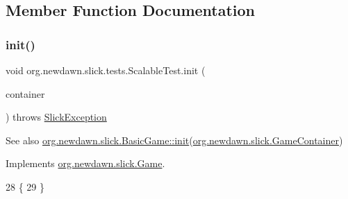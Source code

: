 \subsection{Member Function Documentation}
\mbox{\label{classorg_1_1newdawn_1_1slick_1_1tests_1_1_scalable_test_a99f4c97d1a23306b8313fbb32fd09451}} 
\subsubsection{\texorpdfstring{init()}{init()}}
{\footnotesize\ttfamily void org.\+newdawn.\+slick.\+tests.\+Scalable\+Test.\+init (\begin{DoxyParamCaption}\item[{\mbox{\hyperlink{classorg_1_1newdawn_1_1slick_1_1_game_container}{Game\+Container}}}]{container }\end{DoxyParamCaption}) throws \mbox{\hyperlink{classorg_1_1newdawn_1_1slick_1_1_slick_exception}{Slick\+Exception}}\hspace{0.3cm}{\ttfamily [inline]}}

\begin{DoxySeeAlso}{See also}
\mbox{\hyperlink{classorg_1_1newdawn_1_1slick_1_1_basic_game_a8af0900217e4d389249f71367b22d114}{org.\+newdawn.\+slick.\+Basic\+Game\+::init}}(\mbox{\hyperlink{classorg_1_1newdawn_1_1slick_1_1_game_container}{org.\+newdawn.\+slick.\+Game\+Container}}) 
\end{DoxySeeAlso}


Implements \mbox{\hyperlink{interfaceorg_1_1newdawn_1_1slick_1_1_game_ad2dd6affab08bb8fdb5fab0815957b7a}{org.\+newdawn.\+slick.\+Game}}.


\begin{DoxyCode}
28                                                                     \{
29     \}
\end{DoxyCode}
\mbox{\label{classorg_1_1newdawn_1_1slick_1_1tests_1_1_scalable_test_a7927b211d5081c26b6cfc9909851c365}} 
